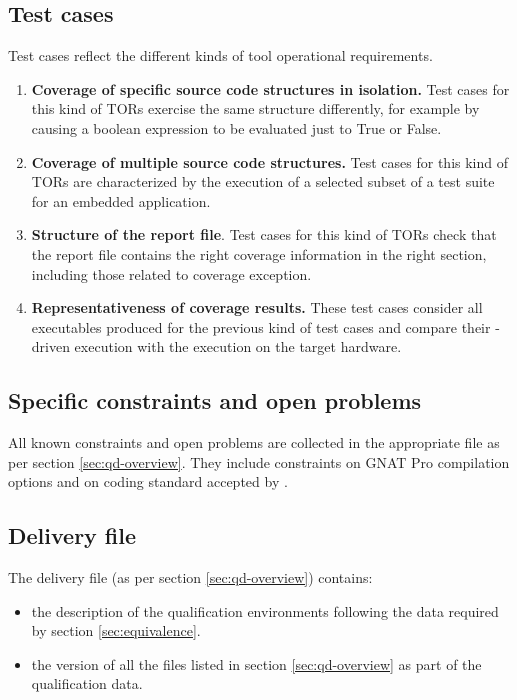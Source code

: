 \documentclass {report}
\begin{document}
\subsection{Test cases}
Test cases reflect the different kinds of tool operational requirements.
\begin{enumerate}

\item \textbf{Coverage of specific source code structures in isolation.} Test cases for this kind of TORs exercise the same structure differently, for example by causing a boolean expression to be evaluated just to True or False.

\item \textbf{Coverage of multiple source code structures.} Test cases for this kind of TORs are characterized by the execution of a selected subset of a test suite for an embedded application. 

\item \textbf{Structure of the report file}. Test cases for this kind of TORs check that the report file contains the right coverage information in the right section, including those related to coverage exception.

\item \textbf{Representativeness of coverage results.} These test cases consider all executables produced for the previous kind of test cases and compare their \xcov{}-driven execution with the execution on the target hardware. 

\end{enumerate}

\subsection{Specific constraints and open problems}
\label{sec:constr-problems}
All known constraints and open problems are collected in the appropriate file as per section \ref{sec:qd-overview}. They include constraints on GNAT Pro compilation options and on coding standard accepted by \xcov{}.

\subsection{Delivery file}
\label{sec:delivery}
The delivery file (as per section \ref{sec:qd-overview}) contains:
\begin{itemize} 
\item the description of the qualification environments following the data required by section \ref{sec:equivalence}.
\item the version of all the files listed in section \ref{sec:qd-overview} as part of the qualification data.
\end{itemize}
\end{document}
